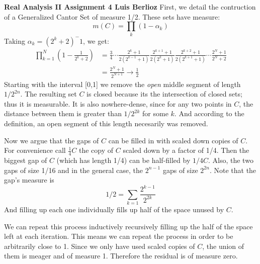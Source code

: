 \noindent\textbf{Real Analysis II Assignment 4 \hspace{\fill} Luis Berlioz}
First, we detail the contruction of a Generalized Cantor Set of measure 1/2. These sets have measure:
$$m(C) = \prod_k (1-\alpha_k)$$
Taking $\alpha_k= (2^k+2)^-1$, we get:
\begin{align*}
\prod_{k=1}^N \left( 1- \frac 1{2^k+2} \right) &= \frac 34 \cdots \frac{2^k+1}{2(2^{k-1} +1)}\frac{2^{k+1}+1}{2(2^{k} +1)}\frac{2^{k+2}+1}{2(2^{k+1} +1)} \cdots \frac{2^N+1}{2^N+2}\\
                                &= \frac{2^N+1}{2^{N+1}} \to \frac 12
\end{align*}
Starting with the interval [0,1]  we remove the \emph{open} middle segment of length $1/2^{2n}$. 
The resulting set $C$ is closed because its the intersection of closed sets; thus it is measurable. 
It is also nowhere-dense, since for any two points in $C$, the distance between them is greater than $1/2^{2k}$ for some $k$.
And according to the definition, an open segment of this length necesarily was removed. 

Now we argue that the gaps of $C$ can be filled in with scaled down copies of $C$. 
For convenience call $\frac 14 C$ the copy of $C$ scaled down by a factor of 1/4.
Then the biggest gap of $C$ (which has length 1/4) can be half-filled by $1/4C$.
Also, the two gaps of size 1/16 and in the general case, the $2^{n-1}$ gaps of size $2^{2n}$. 
Note that the gap's measure is $$1/2 = \sum_{k=1} \frac{2^{k-1}}{2^{2k}}$$
And filling up each one individually fills up half of the space unused by $C$.

We can repeat this process inductively recursively filling up the half of the space left at each iteration. 
This means we can repeat the process in order to be arbitrarily close to 1. 
Since we only have used scaled copies of $C$, the union of them is meager and of measure 1.
Therefore the residual is of measure zero.



